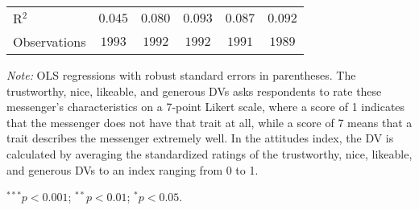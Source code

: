 \begin{table}[!t]
\begin{center}
{\begin{threeparttable}
\begin{tabular}{l c c c c c}
R$^2$                                           & $0.045$        & $0.080$        & $0.093$        & $0.087$        & $0.092$        \\
Observations                                    & $1993$         & $1992$         & $1992$         & $1991$         & $1989$         \\
\bottomrule
\end{tabular}
\begin{tablenotes}[flushleft]
\scriptsize{\item[\hspace{-5mm}] \textit{Note:} OLS regressions with robust standard errors in parentheses. 
The trustworthy, nice, likeable, and generous DVs asks respondents to rate these messenger's characteristics on a 7-point Likert scale, where a score of 1 indicates that the messenger does not have that trait at all, while a score of 7 means that a trait describes the messenger extremely well.
    In the attitudes index, the DV is calculated by averaging the standardized ratings of the trustworthy, nice, likeable, and generous DVs to an index ranging from 0 to 1. \item[\hspace{-5mm}] $^{***}p<0.001$; $^{**}p<0.01$; $^{*}p<0.05$.}
\end{tablenotes}
\end{threeparttable}
}
\label{tab:attitude_regression}
\end{center}
\end{table}

\renewcommand{\baselinestretch}{1.67}%
